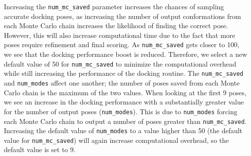 \documentclass[journal=jcisd8,manuscript=article]{achemso}
\begin{document}
Increasing the \texttt{num\_mc\_saved} parameter increases the chances of sampling accurate docking poses, as increasing the number of output conformations from each Monte Carlo chain increases the likelihood of finding the correct pose. However, this will also increase computational time due to the fact that more poses require refinement and final scoring. As \texttt{num\_mc\_saved} gets closer to 100, we see that the docking performance boost is reduced. Therefore, we select a new default value of 50 for \texttt{num\_mc\_saved} to minimize the computational overhead while still increasing the performance of the docking routine. The \texttt{num\_mc\_saved} and \texttt{num\_modes} affect one another; the number of poses saved from each Monte Carlo chain is the maximum of the two values. When looking at the first 9 poses, we see an increase in the docking performance with a substantially greater value for the number of output poses (\texttt{num\_modes}). This is due to \texttt{num\_modes} forcing each Monte Carlo chain to output a number of poses greater than \texttt{num\_mc\_saved}. Increasing the default value of \texttt{num\_modes} to a value higher than 50 (the default value for \texttt{num\_mc\_saved}) will again increase computational overhead, so the default value is set to 9. 
\end{document}
